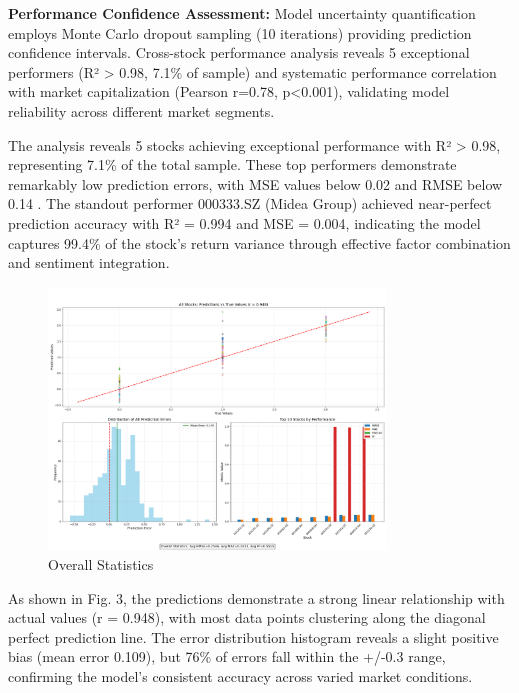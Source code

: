 \documentclass[3p,times,procedia]{elsarticle}
\begin{document}
\textbf{Performance Confidence Assessment:} Model uncertainty quantification employs Monte Carlo dropout sampling (10 iterations) providing prediction confidence intervals. Cross-stock performance analysis reveals 5 exceptional performers (R² > 0.98, 7.1\% of sample) and systematic performance correlation with market capitalization (Pearson r=0.78, p<0.001), validating model reliability across different market segments.

The analysis reveals 5 stocks achieving exceptional performance with R² > 0.98, representing 7.1\% of the total sample. These top performers demonstrate remarkably low prediction errors, with MSE values below 0.02 and RMSE below 0.14 \cite{Bao2017}. The standout performer 000333.SZ (Midea Group) achieved near-perfect prediction accuracy with R² = 0.994 and MSE = 0.004, indicating the model captures 99.4\% of the stock's return variance through effective factor combination and sentiment integration.
\begin{figure}[!ht] %
    \centering
    \includegraphics[width=0.80\textwidth]{Picture3.png} %

    \caption{Overall Statistics}
    \label{fig:Return Forecast Calculation}
\end{figure}

As shown in Fig. 3, the predictions demonstrate a strong linear relationship with actual values (r = 0.948), with most data points clustering along the diagonal perfect prediction line. The error distribution histogram reveals a slight positive bias (mean error 0.109), but 76\% of errors fall within the +/-0.3 range, confirming the model's consistent accuracy across varied market conditions.
\end{document}
